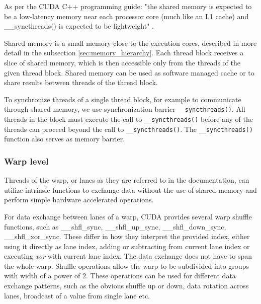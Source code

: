 As per the CUDA C++ programming guide: 
"the shared memory is expected to be a low-latency memory near each processor core (much like an L1 cache) and \_\_syncthreads() is expected to be lightweight" \citep{site:cuda}.

Shared memory is a small memory close to the execution cores, described in more detail in the subsection \ref{sec:memory_hierarchy}. Each thread block receives a slice of shared memory,  which is then accessible only from the threads of the given thread block. Shared memory can be used as software managed cache or to share results between threads of the thread block. 

To synchronize threads of a single thread block, for example to communicate through shared memory, we use synchronization barrier \texttt{\_\_syncthreads()}. All threads in the block must execute the call to \texttt{\_\_syncthreads()} before any of the threads can proceed beyond the call to \texttt{\_\_syncthreads()}. 
The \texttt{\_\_syncthreads()} function also serves as memory barrier. %

\subsubsection{Warp level}
Threads of the warp, or lanes as they are referred to in the documentation, can utilize intrinsic functions to exchange data without the use of shared memory and perform simple hardware accelerated operations. 

For data exchange between lanes of a warp, CUDA provides several warp shuffle functions, such as \_\_shfl\_sync, \_\_shfl\_up\_sync, \_\_shfl\_down\_sync, \_\_shfl\_xor\_sync. These differ in how they interpret the provided index, either using it directly as lane index, adding or subtracting from current lane index or executing \textit{xor} with current lane index. The data exchange does not have to span the whole warp. Shuffle operations allow the warp to be subdivided into groups with width of a power of 2. These operations can be used for different data exchange patterns, such as the obvious shuffle up or down, data rotation across lanes, broadcast of a value from single lane etc.


